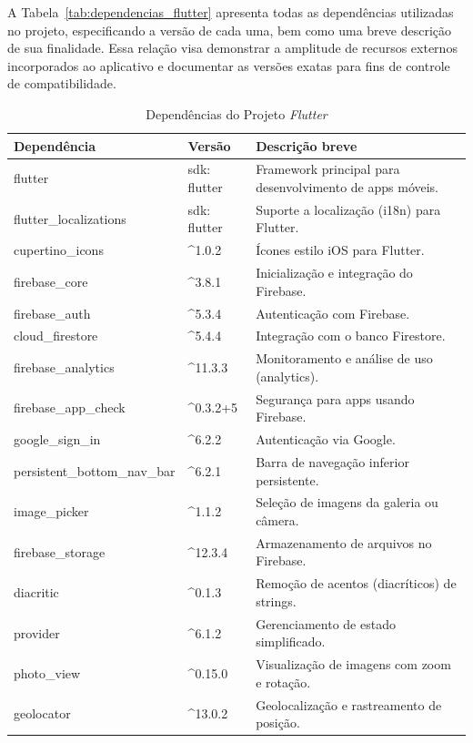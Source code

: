 A Tabela~\ref{tab:dependencias_flutter} apresenta todas as dependências utilizadas 
no projeto, especificando a versão de cada uma, bem como uma breve 
descrição de sua finalidade. Essa relação visa demonstrar a amplitude de recursos externos 
incorporados ao aplicativo e documentar as versões exatas para fins de controle de compatibilidade.

\begin{table}[H]
    \centering
    \caption{Dependências do Projeto \textit{Flutter}}
    \begin{tabular}{|p{4cm}|p{2.5cm}|p{8cm}|}
    \hline
    \textbf{Dependência} & \textbf{Versão} & \textbf{Descrição breve} \\ \hline
    flutter & sdk: flutter & Framework principal para desenvolvimento de apps móveis. \\ \hline
    flutter\_localizations & sdk: flutter & Suporte a localização (i18n) para Flutter. \\ \hline
    cupertino\_icons & \^{}1.0.2 & Ícones estilo iOS para Flutter. \\ \hline
    firebase\_core & \^{}3.8.1 & Inicialização e integração do Firebase. \\ \hline
    firebase\_auth & \^{}5.3.4 & Autenticação com Firebase. \\ \hline
    cloud\_firestore & \^{}5.4.4 & Integração com o banco Firestore. \\ \hline
    firebase\_analytics & \^{}11.3.3 & Monitoramento e análise de uso (analytics). \\ \hline
    firebase\_app\_check & \^{}0.3.2+5 & Segurança para apps usando Firebase. \\ \hline
    google\_sign\_in & \^{}6.2.2 & Autenticação via Google. \\ \hline
    persistent\_bottom\_nav\_bar & \^{}6.2.1 & Barra de navegação inferior persistente. \\ \hline
    image\_picker & \^{}1.1.2 & Seleção de imagens da galeria ou câmera. \\ \hline
    firebase\_storage & \^{}12.3.4 & Armazenamento de arquivos no Firebase. \\ \hline
    diacritic & \^{}0.1.3 & Remoção de acentos (diacríticos) de strings. \\ \hline
    provider & \^{}6.1.2 & Gerenciamento de estado simplificado. \\ \hline
    photo\_view & \^{}0.15.0 & Visualização de imagens com zoom e rotação. \\ \hline
    geolocator & \^{}13.0.2 & Geolocalização e rastreamento de posição. \\ \hline

\end{tabular}
\end{table}
